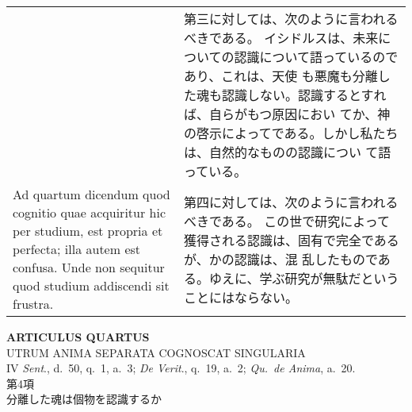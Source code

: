 \documentclass[10pt]{jsarticle} %
\begin{document}
\begin{longtable}{p{21em}p{21em}}
&
第三に対しては、次のように言われるべきである。
イシドルスは、未来についての認識について語っているのであり、これは、天使
 も悪魔も分離した魂も認識しない。認識するとすれば、自らがもつ原因におい
 てか、神の啓示によってである。しかし私たちは、自然的なものの認識につい
 て語っている。


\\




{\sc Ad quartum dicendum} quod cognitio quae
 acquiritur hic per studium, est propria et perfecta; illa autem est
 confusa. Unde non sequitur quod studium addiscendi sit frustra.

&
第四に対しては、次のように言われるべきである。
この世で研究によって獲得される認識は、固有で完全であるが、かの認識は、混
 乱したものである。ゆえに、学ぶ研究が無駄だということにはならない。


\end{longtable}

\newpage
{}


\begin{center}
 {\Large {\bf ARTICULUS QUARTUS}}\\
 {\large UTRUM ANIMA SEPARATA COGNOSCAT SINGULARIA}\\
 {\footnotesize IV {\it Sent}., d.~50, q.~1, a.~3; {\it De Verit}.,
 q.~19, a.~2; {\it Qu.~de Anima}, a.~20.}\\
 {\Large 第4項\\分離した魂は個物を認識するか}
\end{center}
\end{document}
